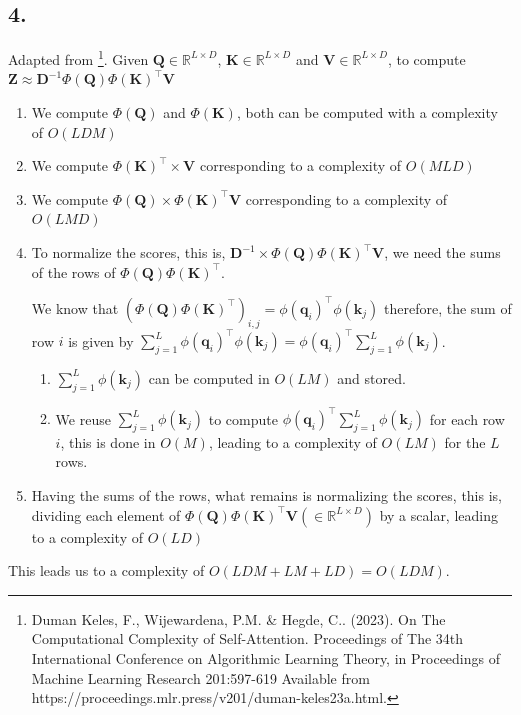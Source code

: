 \documentclass[11pt]{article}
\begin{document}
\subsection{4.}
Adapted from \footnote{Duman Keles, F., Wijewardena, P.M. \& Hegde, C.. (2023). On The Computational Complexity of Self-Attention. Proceedings of The 34th International Conference on Algorithmic Learning Theory, in Proceedings of Machine Learning Research 201:597-619 Available from https://proceedings.mlr.press/v201/duman-keles23a.html.}. Given $\bm{Q} \in \mathbb{R}^{L \times D}$, $\bm{K} \in \mathbb{R}^{L \times D}$ and $\bm{V} \in \mathbb{R}^{L \times D}$, to compute $\bm{Z} \approx \bm{D}^{-1} \Phi \left( \bm{Q} \right) \Phi \left( \bm{K} \right)^{\top} \bm{V}$
\begin{enumerate}
\item We compute $\Phi \left( \bm{Q} \right)$ and $\Phi \left( \bm{K} \right)$, both can be computed with a complexity of $O \left( L D M\right)$
\item We compute $\Phi \left( \bm{K} \right)^{\top} \times \bm{V}$ corresponding to a complexity of $O \left(M L D \right)$
\item We compute $\Phi \left( \bm{Q} \right) \times \Phi \left( \bm{K} \right)^{\top} \bm{V}$ corresponding to a complexity of $O \left( L M D \right)$
\item To normalize the scores, this is, $\bm{D}^{-1} \times \Phi \left( \bm{Q} \right) \Phi \left( \bm{K} \right)^{\top} \bm{V}$, we need the sums of the rows of $\Phi \left( \bm{Q} \right) \Phi \left( \bm{K} \right)^{\top}$.

  We know that $\left( \Phi \left( \bm{Q} \right) \Phi \left( \bm{K} \right)^{\top} \right)_{i, j} = \phi \left( \bm{q}_{i} \right)^{\top} \phi \left( \bm{k}_{j} \right)$ therefore, the sum of row $i$ is given by $\sum_{j = 1}^{L} \phi \left( \bm{q}_{i} \right)^{\top} \phi \left( \bm{k}_{j} \right) = \phi \left( \bm{q}_{i} \right)^{\top} \sum_{j = 1}^{L} \phi \left( \bm{k}_{j} \right)$.
  \begin{enumerate}
  \item $\sum_{j = 1}^{L} \phi \left( \bm{k}_{j} \right)$ can be computed in $O \left( L M \right)$ and stored.
  \item We reuse $\sum_{j = 1}^{L} \phi \left( \bm{k}_{j} \right)$ to compute $\phi \left( \bm{q}_{i} \right)^{\top} \sum_{j = 1}^{L} \phi \left( \bm{k}_{j} \right)$ for each row $i$, this is done in $O \left( M \right)$, leading to a complexity of $O \left( L M \right)$ for the $L$ rows.
  \end{enumerate}
\item Having the sums of the rows, what remains is normalizing the scores, this is, dividing each element of $\Phi \left( \bm{Q} \right) \Phi \left( \bm{K} \right)^{\top} \bm{V} \left( \in \mathbb{R}^{L \times D} \right)$ by a scalar, leading to a complexity of $O \left( LD \right)$
\end{enumerate}
This leads us to a complexity of $O \left( LDM + LM + LD \right) = O \left( LDM \right)$.
\pagebreak
\end{document}
